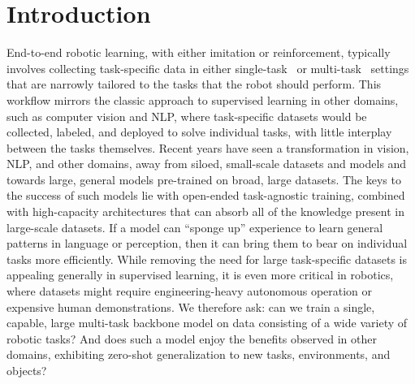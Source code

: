 \documentclass{article} %
\begin{document}
\begin{abstract}
By transferring knowledge from large, diverse, task-agnostic datasets, modern machine learning models can solve specific downstream tasks either zero-shot or with small task-specific datasets to a high level of performance. 
While this capability has been demonstrated in other fields such as computer vision, natural language processing or speech recognition, it remains to be shown in robotics, where the generalization capabilities of the models are particularly critical due to the difficulty of collecting real-world robotic data.
We argue that one of the keys to the success of such general robotic models lies with open-ended task-agnostic training, combined with high-capacity architectures that can 
absorb all of the diverse, robotic data.
In this paper, we present a model class, dubbed Robotics Transformer, that exhibits promising scalable model properties.
We verify our conclusions in a study of different model classes and their ability to generalize as a function of the data size, model size, and data diversity based on a large-scale data collection on real robots performing real-world tasks.
The project’s website and videos can
be found at \url{robotics-transformer1.github.io}
\end{abstract}

\section{Introduction}\label{sec:intro}
\vspace{-0.2cm}
End-to-end robotic learning, with either imitation or reinforcement, typically involves collecting task-specific data in either single-task~\citep{kalashnikov2018qtopt, zhang2018deep} or multi-task~\citep{mtopt2021arxiv, jang2022bc} settings that are narrowly tailored to the tasks that the robot should perform. This workflow mirrors the classic approach to supervised learning in other domains, such as computer vision and NLP, where task-specific datasets would be collected, labeled, and deployed to solve individual tasks, with little interplay between the tasks themselves.
Recent years have seen a transformation in vision, NLP, and other domains, away from siloed, small-scale datasets and models and towards large, general models pre-trained on broad, large datasets. The keys to the success of such models lie with open-ended task-agnostic training, combined with high-capacity architectures that can absorb all of the knowledge present in large-scale datasets.
If a model can ``sponge up'' experience to learn general patterns in language or perception, then it can bring them to bear on individual tasks more efficiently.
While removing the need for large task-specific datasets is appealing generally in supervised learning, it is even more critical in robotics, where datasets might require engineering-heavy autonomous operation or expensive human demonstrations. We therefore ask: can we train a single, capable, large multi-task backbone model on data consisting of a wide variety of robotic tasks? And does such a model enjoy the benefits observed in other domains, exhibiting zero-shot generalization to new tasks, environments, and objects?
\end{document}
